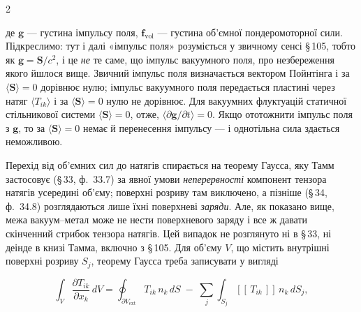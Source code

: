\documentclass[twoside, 10pt]{article}
\begin{document}
\begin{multicols}{2}

де \(\mathbf{g}\) --- густина імпульсу поля, \(\mathbf{f}_{\mathrm{vol}}\) --- густина об'ємної пондеромоторної сили. Підкреслимо: тут і далі «імпульс поля» розуміється у звичному сенсі \S\,105, тобто як \(\mathbf g=\mathbf S/c^2\), і це \emph{не} те саме, що імпульс вакуумного поля, про незбереження якого йшлося вище. Звичний імпульс поля визначається вектором Пойнтінга і за \(\langle\mathbf S\rangle=0\) дорівнює нулю; імпульс вакуумного поля передається пластині через натяг \(\langle T_{ik}\rangle\) і за \(\langle\mathbf S\rangle=0\) нулю не дорівнює. Для вакуумних флуктуацій статичної стільникової системи
\(\langle\mathbf{S}\rangle=0\), отже, \(\langle\partial\mathbf{g}/\partial t\rangle=0\). Якщо
ототожнити імпульс поля з \(\mathbf g\), то за \(\langle\mathbf S\rangle=0\) немає й перенесення
імпульсу --- і однотільна сила здається неможливою.

Перехід від об'ємних сил до натягів спирається на теорему Гаусса, яку Тамм застосовує (\S\,33,
ф.~33.7) за явної умови \emph{неперервності} компонент тензора натягів усередині об'єму; поверхні
розриву там виключено, а пізніше (\S\,34, ф.~34.8) розглядаються лише їхні поверхневі
\emph{заряди}. Але, як показано вище, межа вакуум--метал може не нести поверхневого заряду і все ж
давати скінченний стрибок тензора натягів. Цей випадок не розглянуто ні в \S\,33, ні деінде в книзі
Тамма, включно з \S\,105. Для об'єму \(V\), що містить внутрішні поверхні розриву \(S_j\), теорему
Гаусса треба записувати у вигляді

\end{multicols}
\[
\int_V \frac{\partial T_{ik}}{\partial x_k}\,dV
= \oint_{\partial V_{\mathrm{ext}}} T_{ik}\,n_k\,dS
\;-\; \sum_j \int_{S_j} [\![\,T_{ik}\,]\!]\,n_k\,dS_j ,
\]
\end{document}
